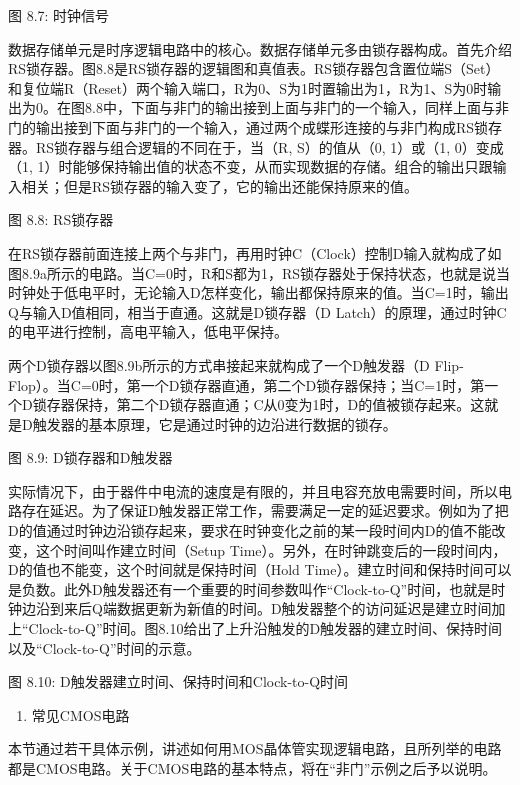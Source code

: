 \documentclass[]{ctexbook}
\providecommand{\tightlist}{%
  \setlength{\itemsep}{0pt}\setlength{\parskip}{0pt}}
\begin{document}
图 8.7: 时钟信号

数据存储单元是时序逻辑电路中的核心。数据存储单元多由锁存器构成。首先介绍RS锁存器。图8.8是RS锁存器的逻辑图和真值表。RS锁存器包含置位端S（Set）和复位端R（Reset）两个输入端口，R为0、S为1时置输出为1，R为1、S为0时输出为0。在图8.8中，下面与非门的输出接到上面与非门的一个输入，同样上面与非门的输出接到下面与非门的一个输入，通过两个成蝶形连接的与非门构成RS锁存器。RS锁存器与组合逻辑的不同在于，当（R, S）的值从（0, 1）或（1, 0）变成（1, 1）时能够保持输出值的状态不变，从而实现数据的存储。组合的输出只跟输入相关；但是RS锁存器的输入变了，它的输出还能保持原来的值。

图 8.8: RS锁存器

在RS锁存器前面连接上两个与非门，再用时钟C（Clock）控制D输入就构成了如图8.9a所示的电路。当C=0时，R和S都为1，RS锁存器处于保持状态，也就是说当时钟处于低电平时，无论输入D怎样变化，输出都保持原来的值。当C=1时，输出Q与输入D值相同，相当于直通。这就是D锁存器（D Latch）的原理，通过时钟C的电平进行控制，高电平输入，低电平保持。

两个D锁存器以图8.9b所示的方式串接起来就构成了一个D触发器（D Flip-Flop）。当C=0时，第一个D锁存器直通，第二个D锁存器保持；当C=1时，第一个D锁存器保持，第二个D锁存器直通；C从0变为1时，D的值被锁存起来。这就是D触发器的基本原理，它是通过时钟的边沿进行数据的锁存。

图 8.9: D锁存器和D触发器

实际情况下，由于器件中电流的速度是有限的，并且电容充放电需要时间，所以电路存在延迟。为了保证D触发器正常工作，需要满足一定的延迟要求。例如为了把D的值通过时钟边沿锁存起来，要求在时钟变化之前的某一段时间内D的值不能改变，这个时间叫作建立时间（Setup Time）。另外，在时钟跳变后的一段时间内，D的值也不能变，这个时间就是保持时间（Hold Time）。建立时间和保持时间可以是负数。此外D触发器还有一个重要的时间参数叫作``Clock-to-Q''时间，也就是时钟边沿到来后Q端数据更新为新值的时间。D触发器整个的访问延迟是建立时间加上``Clock-to-Q''时间。图8.10给出了上升沿触发的D触发器的建立时间、保持时间以及``Clock-to-Q''时间的示意。

图 8.10: D触发器建立时间、保持时间和Clock-to-Q时间

\begin{enumerate}
\def\labelenumi{\arabic{enumi}.}
\setcounter{enumi}{1}
\tightlist
\item
  常见CMOS电路
\end{enumerate}

本节通过若干具体示例，讲述如何用MOS晶体管实现逻辑电路，且所列举的电路都是CMOS电路。关于CMOS电路的基本特点，将在``非门''示例之后予以说明。
\end{document}
